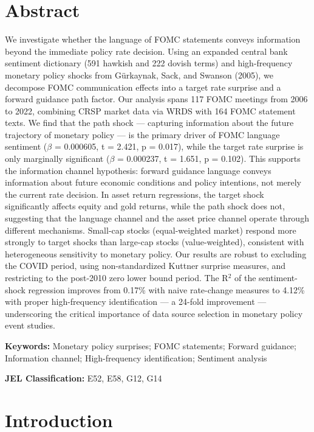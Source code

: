 
\section{Abstract}

We investigate whether the language of FOMC statements conveys information beyond the immediate policy rate decision. Using an expanded central bank sentiment dictionary (591 hawkish and 222 dovish terms) and high-frequency monetary policy shocks from G\"urkaynak, Sack, and Swanson (2005), we decompose FOMC communication effects into a target rate surprise and a forward guidance path factor. Our analysis spans 117 FOMC meetings from 2006 to 2022, combining CRSP market data via WRDS with 164 FOMC statement texts. We find that the path shock --- capturing information about the future trajectory of monetary policy --- is the primary driver of FOMC language sentiment ($\beta$ = 0.000605, t = 2.421, p = 0.017), while the target rate surprise is only marginally significant ($\beta$ = 0.000237, t = 1.651, p = 0.102). This supports the information channel hypothesis: forward guidance language conveys information about future economic conditions and policy intentions, not merely the current rate decision. In asset return regressions, the target shock significantly affects equity and gold returns, while the path shock does not, suggesting that the language channel and the asset price channel operate through different mechanisms. Small-cap stocks (equal-weighted market) respond more strongly to target shocks than large-cap stocks (value-weighted), consistent with heterogeneous sensitivity to monetary policy. Our results are robust to excluding the COVID period, using non-standardized Kuttner surprise measures, and restricting to the post-2010 zero lower bound period. The R$^2$ of the sentiment-shock regression improves from 0.17\% with naive rate-change measures to 4.12\% with proper high-frequency identification --- a 24-fold improvement --- underscoring the critical importance of data source selection in monetary policy event studies.

\textbf{Keywords:} Monetary policy surprises; FOMC statements; Forward guidance; Information channel; High-frequency identification; Sentiment analysis

\textbf{JEL Classification:} E52, E58, G12, G14


\section{Introduction}

